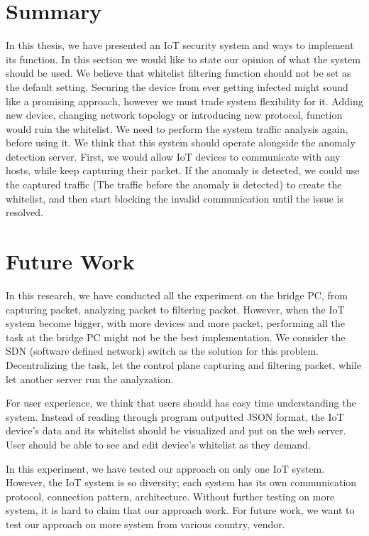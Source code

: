 \section{Summary}
In this thesis, we have presented an IoT security system and ways to implement its function. In this section we would like to state our opinion of what the system should be used. We believe that whitelist filtering function should not be set as the default setting. Securing the device from ever getting infected might sound like a promising approach, however we must trade system flexibility for it. Adding new device, changing network topology or introducing new protocol, function would ruin the whitelist. We need to perform the system traffic analysis again, before using it. We think that this system should operate alongside the anomaly detection server. First, we would allow IoT devices to communicate with any hosts, while keep capturing their packet. If the anomaly is detected, we could use the captured traffic (The traffic before the anomaly is detected) to create the whitelist, and then start blocking the invalid communication until the issue is resolved.  


\section{Future Work}
In this research, we have conducted all the experiment on the bridge PC, from capturing packet, analyzing packet to filtering packet. However, when the IoT system become bigger, with more devices and more packet, performing all the task at the bridge PC might not be the best implementation. We consider the SDN (software defined network) switch as the solution for this problem. Decentralizing the task, let the control plane capturing and filtering packet, while let another server run the analyzation.  

For user experience, we think that users should has easy time understanding the system. Instead of reading through program outputted JSON format, the IoT device’s data and its whitelist should be visualized and put on the web server. User should be able to see and edit device’s whitelist as they demand.  

 

In this experiment, we have tested our approach on only one IoT system. However, the IoT system is so diversity; each system has its own communication protocol, connection pattern, architecture. Without further testing on more system, it is hard to claim that our approach work. For future work, we want to test our approach on more system from various country, vendor.  